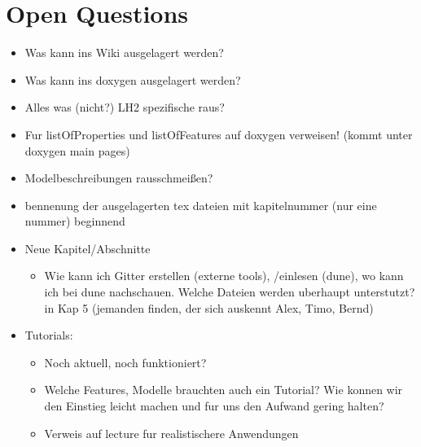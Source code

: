 \section{Open Questions}
\begin{itemize}
  \item Was kann ins Wiki ausgelagert werden?
  \item Was kann ins doxygen ausgelagert werden?
  \item Alles was (nicht?) LH2 spezifische raus?
  \item Fur listOfProperties und listOfFeatures auf doxygen verweisen! (kommt
        unter doxygen main pages)
  \item Modelbeschreibungen rausschmeißen?
  \item bennenung der ausgelagerten tex dateien mit kapitelnummer (nur eine nummer)
        beginnend
  \item Neue Kapitel/Abschnitte
  \begin{itemize}
    \item Wie kann ich Gitter erstellen (externe tools), /einlesen (dune), wo
          kann ich bei dune nachschauen. Welche Dateien werden uberhaupt unterstutzt?
          in Kap 5 (jemanden finden, der sich auskennt Alex, Timo, Bernd)
  \end{itemize}
  \item Tutorials:
  \begin{itemize}
    \item Noch aktuell, noch funktioniert?
    \item Welche Features, Modelle brauchten auch ein Tutorial? Wie konnen wir
          den Einstieg leicht machen und fur uns den Aufwand gering halten?
    \item Verweis auf lecture fur realistischere Anwendungen
  \end{itemize}
\end{itemize}

